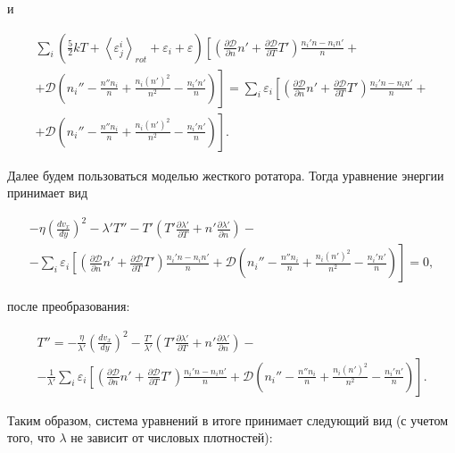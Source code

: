 \documentclass[12pt]{article}
\begin{document}
и

\begin{multline}
   \sum_{i} \left(\frac{5}{2}kT + \left<\varepsilon^{i}_{j} \right>_{rot} + \varepsilon_{i} + \varepsilon \right) \left[\left(\frac{\partial \mathcal{D}}{\partial n}n' + \frac{\partial \mathcal{D}}{\partial T}T' \right) \frac{n_{i}'n - n_{i}n'}{n} \right. + \\
  + \left. \mathcal{D}\left(n_{i}'' - \frac{n''n_{i}}{n} + \frac{n_{i}\left(n'\right)^2}{n^2} - \frac{n_{i}'n'}{n} \right)  \right] =  \sum_{i}\varepsilon_{i} \left[\left(\frac{\partial \mathcal{D}}{\partial n}n' + \frac{\partial \mathcal{D}}{\partial T}T' \right) \frac{n_{i}'n - n_{i}n'}{n} \right. + \\
  + \left. \mathcal{D}\left(n_{i}'' - \frac{n''n_{i}}{n} + \frac{n_{i}\left(n'\right)^2}{n^2} - \frac{n_{i}'n'}{n} \right)  \right].
\end{multline}

Далее будем пользоваться моделью жесткого ротатора. Тогда уравнение энергии принимает вид

\begin{multline}
  - \eta \left(\frac{d v_{x}}{d y} \right)^2 -\lambda' T'' - T' \left(T' \frac{\partial \lambda'}{\partial T} + n' \frac{\partial \lambda'}{\partial n} \right) - \\
  - \sum_{i}\varepsilon_{i} \left[\left(\frac{\partial \mathcal{D}}{\partial n}n' + \frac{\partial \mathcal{D}}{\partial T}T' \right) \frac{n_{i}'n - n_{i}n'}{n} \right. + \left. \mathcal{D}\left(n_{i}'' - \frac{n''n_{i}}{n} + \frac{n_{i}\left(n'\right)^2}{n^2} - \frac{n_{i}'n'}{n} \right)  \right] = 0,
\end{multline}

после преобразования:

\begin{multline}
  T'' = -\frac{\eta}{\lambda'} \left(\frac{d v_{x}}{d y} \right)^2 - \frac{T'}{\lambda'} \left(T' \frac{\partial \lambda'}{\partial T} + n' \frac{\partial \lambda'}{\partial n} \right) - \\
  - \frac{1}{\lambda'}\sum_{i}\varepsilon_{i} \left[\left(\frac{\partial \mathcal{D}}{\partial n}n' + \frac{\partial \mathcal{D}}{\partial T}T' \right) \frac{n_{i}'n - n_{i}n'}{n} \right. + \left. \mathcal{D}\left(n_{i}'' - \frac{n''n_{i}}{n} + \frac{n_{i}\left(n'\right)^2}{n^2} - \frac{n_{i}'n'}{n} \right)  \right].
\end{multline}

Таким образом, система уравнений в итоге принимает следующий вид (с учетом того, что $\lambda$ не зависит от числовых плотностей):
\end{document}
